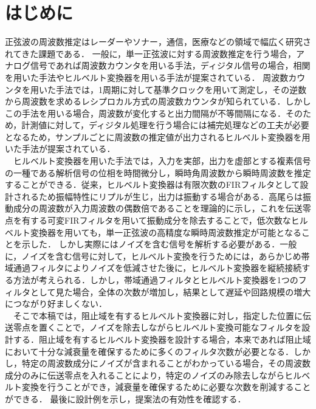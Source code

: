 \documentclass[technicalreport]{ieicej}
\begin{document}
\section{はじめに}
正弦波の周波数推定はレーダーやソナー，通信，医療などの領域で幅広く研究されてきた課題である\cite{R.G.McKilliam,K.Wang,D.Rife}．
一般に，単一正弦波に対する周波数推定を行う場合，アナログ信号であれば周波数カウンタを用いる手法，ディジタル信号の場合，相関を用いた手法やヒルベルト変換器を用いる手法が提案されている．
周波数カウンタを用いた手法では，1周期に対して基準クロックを用いて測定し，その逆数から周波数を求めるレシプロカル方式の周波数カウンタが知られている．しかしこの手法を用いる場合，周波数が変化すると出力間隔が不等間隔になる．そのため，計測値に対して，ディジタル処理を行う場合には補完処理などの工夫が必要となるため，サンプルごとに周波数の推定値が出力されるヒルベルト変換器を用いた手法が提案されている．\\
　ヒルベルト変換器を用いた手法では，入力を実部，出力を虚部とする複素信号の一種である解析信号の位相を時間微分し，瞬時角周波数から瞬時周波数を推定することができる．従来，ヒルベルト変換器は有限次数のFIRフィルタとして設計されるため振幅特性にリプルが生じ，出力は振動する場合がある．高尾ら\cite{高尾可変なし,高尾可変あり}は振動成分の周波数が入力周波数の偶数倍であることを理論的に示し，これを伝送零点を有する可変FIRフィルタを用いて振動成分を除去することで，低次数なヒルベルト変換器を用いても，単一正弦波の高精度な瞬時周波数推定が可能となることを示した．
しかし実際にはノイズを含む信号を解析する必要がある．一般に，ノイズを含む信号に対して，ヒルベルト変換を行うためには，あらかじめ帯域通過フィルタによりノイズを低減させた後に，ヒルベルト変換器を縦続接続する方法が考えられる．しかし，帯域通過フィルタとヒルベルト変換器を1つのフィルタとして見た場合，全体の次数が増加し，結果として遅延や回路規模の増大につながり好ましくない．\\
　そこで本稿では，阻止域を有するヒルベルト変換器に対し，指定した位置に伝送零点を置くことで，ノイズを除去しながらヒルベルト変換可能なフィルタを設計する．阻止域を有するヒルベルト変換器を設計する場合，本来であれば阻止域において十分な減衰量を確保するために多くのフィルタ次数が必要となる．しかし，特定の周波数成分にノイズが含まれることがわかっている場合，その周波数成分のみに伝送零点を入れることにより，特定のノイズのみ除去しながらヒルベルト変換を行うことができ，減衰量を確保するために必要な次数を削減することができる．
最後に設計例を示し，提案法の有効性を確認する．
\end{document}
